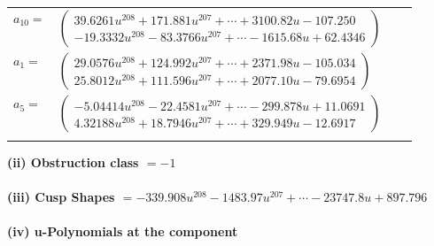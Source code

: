 \documentclass[1p]{elsarticle_modified}
\theoremstyle{definition}
\begin{document}
\begin{tabular}{m{7pt} m{180pt} m{7pt} m{180pt} }
\flushright $a_{10}=$&$\begin{pmatrix}39.6261 u^{208}+171.881 u^{207}+\cdots+3100.82 u-107.250\\-19.3332 u^{208}-83.3766 u^{207}+\cdots-1615.68 u+62.4346\end{pmatrix}$ \\
\flushright $a_{1}=$&$\begin{pmatrix}29.0576 u^{208}+124.992 u^{207}+\cdots+2371.98 u-105.034\\25.8012 u^{208}+111.596 u^{207}+\cdots+2077.10 u-79.6954\end{pmatrix}$ \\
\flushright $a_{5}=$&$\begin{pmatrix}-5.04414 u^{208}-22.4581 u^{207}+\cdots-299.878 u+11.0691\\4.32188 u^{208}+18.7946 u^{207}+\cdots+329.949 u-12.6917\end{pmatrix}$\\&\end{tabular}
\flushleft \textbf{(ii) Obstruction class $= -1$}\\~\\
\flushleft \textbf{(iii) Cusp Shapes $= -339.908 u^{208}-1483.97 u^{207}+\cdots-23747.8 u+897.796$}\\~\\
\newpage\renewcommand{\arraystretch}{1}
\flushleft \textbf{(iv) u-Polynomials at the component}\newline \\
\end{document}
